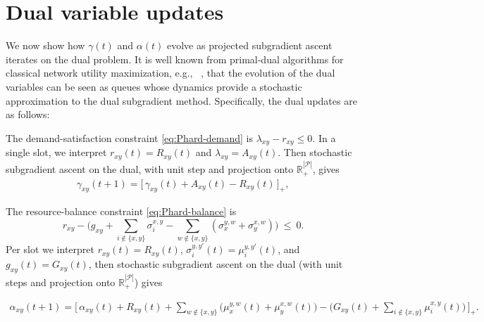 \documentclass[11pt]{article}
\newcommand{\Pairs}{\mathcal{P}} %
\begin{document}
\section{Dual variable updates}\label{sec:primal-dual}

We now show how $\gamma(t)$ and $\alpha(t)$ evolve as projected subgradient ascent iterates on the dual problem. It is well known from primal-dual algorithms for classical network utility maximization, e.g., ~\cite{Stolyar2006GreedyPrimalDual, Neely2010StochasticNetworkOptimization}, that the evolution of the dual variables can be seen as queues whose dynamics provide a  stochastic approximation to the dual subgradient method. Specifically, the dual updates are as follows: 

The demand-satisfaction constraint \eqref{eq:Phard-demand} is $\lambda_{xy} - r_{xy} \le 0$.
In a single slot, we interpret $r_{xy}(t)=R_{xy}(t)$ and $\lambda_{xy}=A_{xy}(t)$. Then stochastic subgradient ascent on the dual, with unit step and projection onto $\mathbb{R}_+^{|\Pairs|}$, gives
\begin{align}
\gamma_{xy}(t{+}1)
=\Big[\,
\gamma_{xy}(t)+A_{xy}(t)-R_{xy}(t)
\,\Big]_+,
\label{eq:gamma-update-full}
\end{align}

The resource-balance constraint \eqref{eq:Phard-balance} is
\[
r_{xy} - 
\Big(
g_{xy}
+\sum_{i\notin\{x,y\}}\sigma_i^{x,y}
-\sum_{w\notin\{x,y\}}(\sigma_x^{y,w}+\sigma_y^{x,w})
\Big)
\ \le\ 0.
\]
Per slot we interpret $r_{xy}(t)=R_{xy}(t)$, $\sigma_i^{y,y'}(t)=\mu_i^{y,y'}(t)$, and $g_{xy}(t)=G_{xy}(t)$, then stochastic subgradient ascent on the dual (with
unit steps and projection onto $\mathbb{R}_+^{|\Pairs|}$) gives


\begin{align}
\alpha_{xy}(t{+}1)
=\Big[\,
\alpha_{xy}(t)
+ R_{xy}(t)
+ \sum_{w\notin\{x,y\}}\big(\mu_x^{y,w}(t)+\mu_y^{x,w}(t)\big)
- \Big(
G_{xy}(t)
+\sum_{i\notin\{x,y\}}\mu_i^{x,y}(t)
\Big)
\,\Big]_+.
\label{eq:alphares-update-full}
\end{align}
\end{document}
